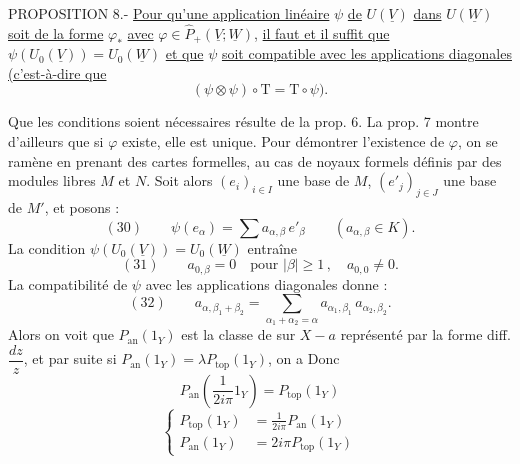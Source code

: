 PROPOSITION 8.- \uline{Pour qu'une application linéaire} $\psi$ \uline{de} $U(\underline V)$ \uline{dans} $U(\underline W)$ \uline{soit de la forme} $\varphi_*$ \uline{avec} $\varphi\in\widehat P_+(\underline V;\underline W)$, \uline{il faut et il suffit que} $\psi(U_0(\underline V))=U_0(\underline W)$ \uline{et que} $\psi$ \uline{soit compatible avec les applications diagonales} \uline{(c'est-à-dire que}
\[
(\psi\otimes\psi)\circ\mathrm T=\mathrm T\circ\psi).
\]

Que les conditions soient nécessaires résulte de la prop. 6. La prop. 7 montre d'ailleurs que si $\varphi$ existe, elle est unique. Pour démontrer l'existence de $\varphi$, on se ramène en prenant des cartes formelles, au cas de noyaux formels définis par des modules libres $M$ et $N$. Soit alors $(e_i)_{i\in I}$ une base de $M$, $(e'_j)_{j\in J}$ une base de $M'$, et posons :
\[
(30)\qquad \psi(e_\alpha)=\sum a_{\alpha,\beta}\,e'_\beta
\qquad (a_{\alpha,\beta}\in K).
\]
La condition $\psi(U_0(\underline V))=U_0(\underline W)$ entraîne
\[
(31)\qquad a_{0,\beta}=0\quad\text{pour }|\beta|\geq 1\,,\quad a_{0,0}\neq 0.
\]
La compatibilité de $\psi$ avec les applications diagonales donne :
\[
(32)\qquad a_{\alpha,\beta_1+\beta_2}=\sum_{\alpha_1+\alpha_2=\alpha}a_{\alpha_1,\beta_1}\,a_{\alpha_2,\beta_2}.
\]
Alors on voit que $P_{\mathrm{an}}(1_Y)$ est la classe de  sur $X-a$ représenté par la forme diff. $\dfrac{dz}{z}$, et par suite  si $P_{\mathrm{an}}(1_Y)=\lambda P_{\mathrm{top}}(1_Y)$, on a
Donc
\[
\boxed{P_{\mathrm{an}}\left(\frac{1}{2i\pi}1_Y\right)=P_{\mathrm{top}}(1_Y)}
\]
\[
\boxed{\left\{\begin{aligned}
P_{\mathrm{top}}(1_Y)&=\frac{1}{2i\pi}P_{\mathrm{an}}(1_Y)\\
P_{\mathrm{an}}(1_Y)&=2i\pi P_{\mathrm{top}}(1_Y)
\end{aligned}\right.}
\]

